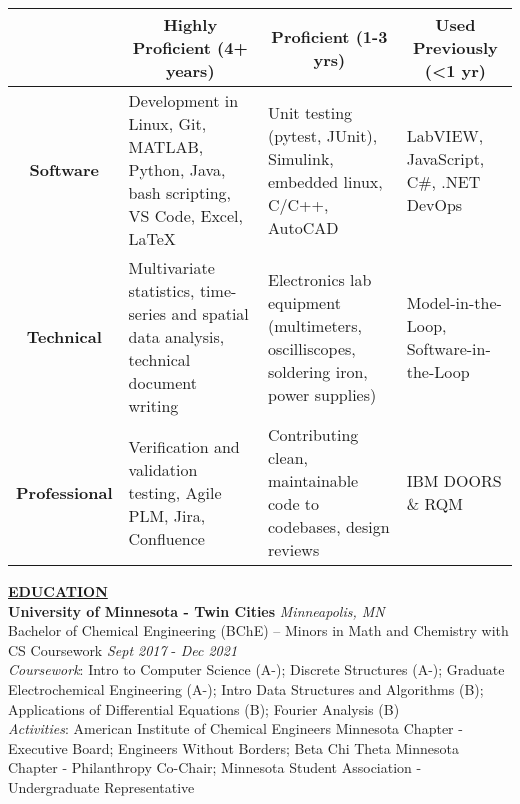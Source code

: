 \documentclass{article}
\begin{document}
\begin{center}
\begin{tabular}{ |c |m{5cm}|m{5cm}|m{5cm}| }
    \cline{2-4}
    \multicolumn{1}{c|}{} & \multicolumn{1}{c|}{\textbf{Highly Proficient (4+ years)}} & \multicolumn{1}{c|}{\textbf{Proficient (1-3 yrs)}} & \multicolumn{1}{c|}{\textbf{Used Previously (\textless1 yr)}}\\
    \hline
  
    \textbf{Software} & Development in Linux, Git, MATLAB, Python, Java, bash scripting, VS Code, Excel, \LaTeX & Unit testing (pytest, JUnit), Simulink, embedded linux, C/C++, AutoCAD & LabVIEW, JavaScript, C\#, .NET DevOps\\
    \hline
    \textbf{Technical} & Multivariate statistics, time-series and spatial data analysis, technical document writing & Electronics lab equipment (multimeters, oscilliscopes, soldering iron, power supplies) & Model-in-the-Loop, Software-in-the-Loop \\
    \hline
    \textbf{Professional} & Verification and validation testing, Agile PLM, Jira, Confluence & Contributing clean, maintainable code to codebases, design reviews & IBM DOORS \& RQM \\
    \hline
    \end{tabular}
\end{center}

\vspace{7 pt}

\noindent \textbf{\large\underline{EDUCATION}} \\
\textbf{University of Minnesota - Twin Cities} \hfill \textit{Minneapolis, MN} \\
Bachelor of Chemical Engineering (BChE) -- Minors in Math and Chemistry with CS Coursework \hfill \textit{Sept 2017} - \textit{Dec 2021} \\
\textit{Coursework}: Intro to Computer Science (A-); Discrete Structures (A-); Graduate Electrochemical Engineering (A-); Intro Data Structures and Algorithms (B);  Applications of Differential Equations (B); Fourier Analysis (B) \\
\textit{Activities}: American Institute of Chemical Engineers Minnesota Chapter - Executive Board; Engineers Without Borders; Beta Chi Theta Minnesota Chapter - Philanthropy Co-Chair; Minnesota Student Association - Undergraduate Representative \\
\end{document}
